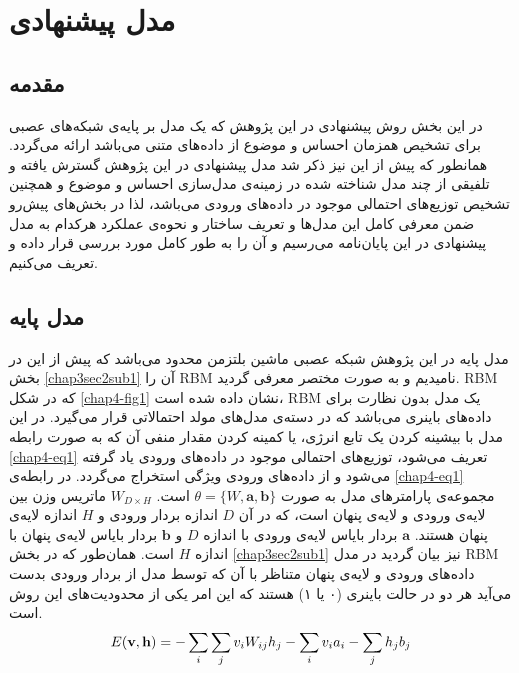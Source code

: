 \chapter{مدل پیشنهادی}
\thispagestyle{empty}
\section{مقدمه}
در این بخش روش پیشنهادی در این پژوهش که یک مدل بر پایه‌ی شبکه‌های عصبی برای تشخیص همزمان احساس و موضوع از داده‌های متنی می‌‌باشد ارائه می‌‌گردد. همانطور که پیش از این نیز ذکر شد مدل پیشنهادی در این پژوهش گسترش یافته و تلفیقی از چند مدل شناخته شده در زمینه‌ی مدل‌سازی احساس و موضوع و همچنین تشخیص توزیع‌های احتمالی‌ موجود در داده‌های ورودی می‌‌باشد، لذا در بخش‌های پیش‌ر‌‌و ضمن معرفی‌ کامل این مدل‌ها و تعریف ساختار و 
نحو‌ه‌ی عملکرد هرکدام به مدل پیشنهادی در این پایان‌‌نامه می‌‌رسیم و آن را به طور کامل مورد بررسی‌ قرار داده و تعریف می‌‌کنیم.

\section{مدل پایه}
\label{chap4sec2}
مدل پایه در این پژوهش  شبکه عصبی ماشین بلتزمن محدود می‌باشد که پیش از این در بخش
\ref{chap3sec2sub1}
 آن را
RBM
نامیدیم و به صورت مختصر معرفی‌ گردید.
RBM
که در شکل
\ref{chap4-fig1}
نشان داده شده است،
 RBM 
 یک مدل بدون نظارت برای داده‌های باینری می‌باشد که در دسته‌ی مدل‌های مولد احتمالاتی  قرار می‌گیرد. در این مدل با بیشینه کردن یک تابع انرژی، یا کمینه کردن مقدار منفی‌ آن که به صورت رابطه
\ref{chap4-eq1}
تعریف می‌‌شود، توزیع‌های احتمالی‌ موجود در داده‌های ورودی یاد گرفته می‌شود و از داده‌های ورودی ویژگی‌ استخراج می‌‌گردد. در رابطه‌ی
\ref{chap4-eq1}
مجموعه‌ی پارامترهای مدل به صورت
$\theta = \{W, \textbf{a}, \textbf{b}\}$
است.
$W_{D \times H}$
ماتریس وزن بین لایه‌ی ورودی و لایه‌ی پنهان است، که در آن
$D$
اندازه بردار ورودی و
$H$
اندازه لایه‌ی پنهان هستند.
$\textbf{a}$
بردار بایاس لایه‌ی ورودی با اندازه
$D$
و
$\textbf{b}$
بردار بایاس لایه‌ی پنهان با اندازه
$H$
 است. همان‌طور که در بخش 
 \ref{chap3sec2sub1}
نیز بیان گردید در مدل
 RBM
 داده‌های ورودی و لایه‌ی پنهان متناظر با آن که توسط مدل از بردار ورودی بدست می‌‌آید هر دو در حالت باینری (۰ یا ۱) هستند که این امر یکی‌ از محدودیت‌های این روش است.
\begin{align}
	\centering
	\label{chap4-eq1}
	E(\textbf{v},\textbf{h}) = -\sum_{i} \sum_{j} v_iW_{ij}h_j - \sum_i v_ia_i - \sum_j h_jb_j
\end{align}


